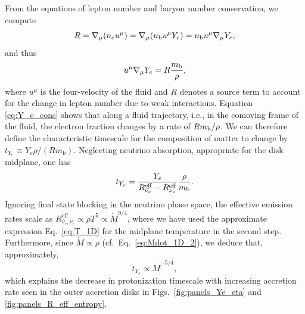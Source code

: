 From the equations of lepton number and baryon number conservation, we
compute
\begin{equation}
  R = \nabla_\mu(n_e u^\mu) = \nabla_\mu(n_{\rm b} u^\mu Y_e) = n_{\rm b} u^\mu
  \nabla_\mu Y_e,
\end{equation}
and thus
\begin{equation}
  u^\mu \nabla_\mu Y_e = R \frac{m_{\rm b}}{\rho}, \label{eq:Y_e_cons}
\end{equation}
where $u^\mu$ is the four-velocity of the fluid and $R$ denotes a source term to account for the change in lepton number due to weak interactions. Equation \eqref{eq:Y_e_cons} shows that along a fluid trajectory, i.e., in the comoving frame of the fluid, the electron fraction changes by a rate of $R m_{\rm b}/ \rho$. We can therefore define the characteristic timescale for the composition of matter to change by $t_{Y_e} \equiv Y_e\rho / (R m_\mathrm{b})$. Neglecting neutrino absorption, appropriate for the disk midplane, one has
\begin{equation}
  t_{Y_e} = \frac{Y_e}{R_{\bar{\nu_e}}^\mathrm{eff} -
    R_{\nu_e}^\mathrm{eff}}\frac{\rho}{m_{\rm b}}. \label{eq:t_Ye}
\end{equation}
Ignoring final state blocking in the neutrino phase space, the effective emission rates scale as \cite{tubbs_neutrino_1975,bruenn_stellar_1985} $R_{\bar{\nu}_e,\nu_e}^\mathrm{eff} \propto \rho T^5 \propto \dot{M}^{9/4}$, where we have used the approximate expression Eq.~\eqref{eq:T_1D} for the midplane temperature in the second step. Furthermore, since $\dot{M}\propto \rho$ (cf.~Eq.~\eqref{eq:Mdot_1D_2}), we deduce that, approximately,
\begin{equation}
  t_{Y_e} \propto \dot{M}^{-5/4},  \label{eq:t_Ye_scale_Mdot}
\end{equation}
which explains the decrease in protonization timescale with increasing accretion rate seen in the outer accretion disks in Figs.~\ref{fig:panels_Ye_eta} and \ref{fig:panels_R_eff_entropy}.


